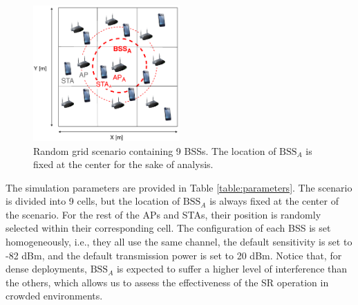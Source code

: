 \documentclass{article}
\begin{document}
\begin{figure}[ht!]
	\centering
	\includegraphics[width=0.5\textwidth]{random_scenario}
	\caption{Random grid scenario containing 9 BSSs. The location of $\text{BSS}_A$ is fixed at the center for the sake of analysis.}
	\label{fig:random_scenario}
\end{figure}

The simulation parameters are provided in Table \ref{table:parameters}. The scenario is divided into 9 cells, but the location of $\text{BSS}_A$ is always fixed at the center of the scenario. For the rest of the APs and STAs, their position is randomly selected within their corresponding cell. The configuration of each BSS is set homogeneously, i.e., they all use the same channel, the default sensitivity is set to -82 dBm, and the default transmission power is set to 20 dBm. Notice that, for dense deployments, $\text{BSS}_A$ is expected to suffer a higher level of interference than the others, which allows us to assess the effectiveness of the SR operation in crowded environments.
\end{document}
